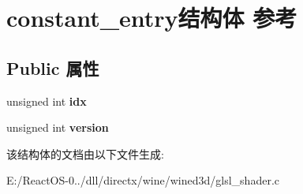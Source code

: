 \hypertarget{structconstant__entry}{}\section{constant\+\_\+entry结构体 参考}
\label{structconstant__entry}
\subsection*{Public 属性}
\begin{DoxyCompactItemize}
\item 
\mbox{\label{structconstant__entry_af42117094c7bfd48b45362877adc3bbd}} 
unsigned int {\bfseries idx}
\item 
\mbox{\label{structconstant__entry_a01ab63abc5637e0acafb8efc21a2aab4}} 
unsigned int {\bfseries version}
\end{DoxyCompactItemize}


该结构体的文档由以下文件生成\+:\begin{DoxyCompactItemize}
\item 
E\+:/\+React\+O\+S-\/0../dll/directx/wine/wined3d/glsl\+\_\+shader.\+c\end{DoxyCompactItemize}

